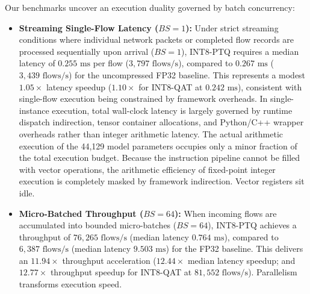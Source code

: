 \documentclass[conference]{IEEEtran}
\begin{document}
Our benchmarks uncover an execution duality governed by batch concurrency:
\begin{itemize}
    \item \textbf{Streaming Single-Flow Latency ($BS = 1$):} Under strict streaming conditions where individual network packets or completed flow records are processed sequentially upon arrival ($BS = 1$), INT8-PTQ requires a median latency of $0.255\text{ ms}$ per flow ($3,797\text{ flows/s}$), compared to $0.267\text{ ms}$ ($3,439\text{ flows/s}$) for the uncompressed FP32 baseline. This represents a modest $1.05\times$ latency speedup ($1.10\times$ for INT8-QAT at $0.242\text{ ms}$), consistent with single-flow execution being constrained by framework overheads. In single-instance execution, total wall-clock latency is largely governed by runtime dispatch indirection, tensor container allocations, and Python/C++ wrapper overheads rather than integer arithmetic latency. The actual arithmetic execution of the 44,129 model parameters occupies only a minor fraction of the total execution budget. Because the instruction pipeline cannot be filled with vector operations, the arithmetic efficiency of fixed-point integer execution is completely masked by framework indirection. Vector registers sit idle.
    \item \textbf{Micro-Batched Throughput ($BS = 64$):} When incoming flows are accumulated into bounded micro-batches ($BS = 64$), INT8-PTQ achieves a throughput of $76,265\text{ flows/s}$ (median latency $0.764\text{ ms}$), compared to $6,387\text{ flows/s}$ (median latency $9.503\text{ ms}$) for the FP32 baseline. This delivers an $11.94\times$ throughput acceleration ($12.44\times$ median latency speedup; and $12.77\times$ throughput speedup for INT8-QAT at $81,552\text{ flows/s}$). Parallelism transforms execution speed.
\end{itemize}
\end{document}
